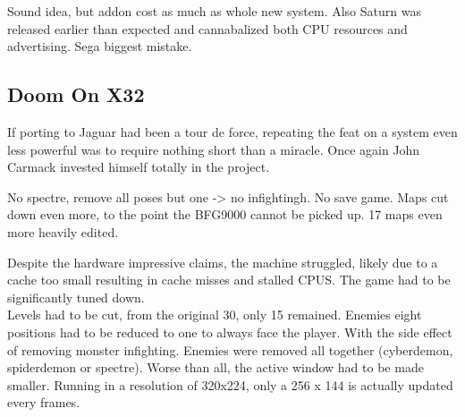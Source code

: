 Sound idea, but addon cost as much as whole new system. Also Saturn was released earlier than expected and cannabalized both CPU resources and advertising. Sega biggest mistake.\\
\par
{}

\subsection{Doom On X32}
If porting \doom to Jaguar had been a tour de force, repeating the feat on a system even less powerful was to require nothing short than a miracle. Once again John Carmack invested himself totally in the project.\\
\par
{}
\par
No spectre, remove all poses but one -> no infightingh. No save game. Maps cut down even more, to the point the BFG9000 cannot be picked up. 17 maps even more heavily edited.
\par
Despite the hardware impressive claims, the machine struggled, likely due to a cache too small resulting in cache misses and stalled CPUS. The game had to be significantly tuned down.\\ 
Levels had to be cut, from the original 30, only 15 remained. Enemies eight positions had to be reduced to one to always face the player. With the side effect of removing monster infighting. Enemies were removed all together (cyberdemon, spiderdemon or spectre). Worse than all, the active window had to be made smaller. Running in a resolution of 320x224, only a 256 x 144 is actually updated every frames.\\

